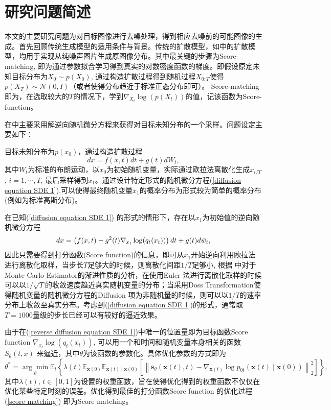 \chapter{研究问题简述}
本文的主要研究问题为对目标图像进行去噪处理，得到相应去噪前的可能图像的生成。首先回顾传统生成模型的适用条件与背景。传统的扩散模型，如\cite{song_2,DDPM,DDIM}中的扩散模型，均用于实现从纯噪声图片生成原图像分布。其中最关键的步骤为Score-matching, 即为通过参数拟合学习得到真实的对数密度函数的梯度。即假设原定未知目标分布为$X_0\sim p(X_0)$, 通过构造扩散过程得到随机过程$X_{0:T}$使得$p(X_{T})\sim \mathcal{N}(0,I)$（或者使得分布趋近于标准正态分布即可）。 Score-matching即为，在选取较大的$T$的情况下，学到$\nabla_{X_t}\log (p(X_t))$的值，记该函数为Score-function。     

在\cite{song_2}中主要采用解逆向随机微分方程来获得对目标未知分布的一个采样。问题设定主要如下：   

目标未知分布为$p(x_0)$，通过构造扩散过程
\begin{equation}
    dx = f(x,t)dt + g(t)dW_t,
    \label{diffusion equation SDE 1}
\end{equation}
其中$W_t$为标准的布朗运动，以$x_0$为初始随机变量，实际通过欧拉法离散化生成$x_{i/T}$, $i=1,\cdots, T$, 最后采样得到$x_1$。通过设计特定形式的随机微分方程(\ref{diffusion equation SDE 1}),可以使得最终随机变量$x_1$的概率分布为形式较为简单的概率分布 (例如为标准高斯分布)。   

在已知(\ref{diffusion equation SDE 1}) 的形式的情形下，存在以$x_1$为初始值的逆向随机微分方程
\begin{equation}
     dx = \left(f(x,t)-g^2(t)\nabla_{x_t}\log(q_t(x_t))\right)dt + g(t)d\Tilde{w}_t,
    \label{reverse diffusion equation SDE 1}
\end{equation}
因此只需要得到打分函数(Score function)的信息，即可从$x_1$开始逆向利用欧拉法进行离散化取样，当步长$T$足够大的时候，则离散化间距$1/T$足够小, 根据 
\cite{detemple}中对于Monte Carlo Estimator的渐进性质的分析，在使用Euler 法进行离散化取样的时候可以以$1/\sqrt{T}$的收敛速度趋近真实随机变量的分布；当采用Doss Transformation使得随机变量的随机微分方程的Diffusion 项为非随机量的时候，则可以以$1/T$的速率分布上收敛至真实分布。考虑到(\ref{diffusion equation SDE 1})的形式，通常取$T=1000$量级的步长已经可以有较好的逼近效果。      

由于在(\ref{reverse diffusion equation SDE 1})中唯一的位置量即为目标函数Score function $\nabla_{x_t}\log(q_t(x_t))$, 可以用一个和时间和随机变量本身相关的函数$S_{\theta}(t,x)$ 来逼近，其中$\theta$为该函数的参数化。具体优化参数的方式即为
\begin{equation}
{\theta}^*=\underset{{\theta}}{\arg \min } \mathbb{E}_t\left\{\lambda(t) \mathbb{E}_{\mathbf{x}(0)} \mathbb{E}_{\mathbf{x}(t) \mid \mathbf{x}(0)}\left[\left\|\mathbf{s}_{{\theta}}(\mathbf{x}(t), t)-\nabla_{\mathbf{x}(t)} \log p_{0 t}(\mathbf{x}(t) \mid \mathbf{x}(0))\right\|_2^2\right]\right\},
\label{score matching}
\end{equation}
其中$\lambda(t)$, $t\in [0,1]$为设置的权重函数，旨在使得优化得到的权重函数不仅仅在优化某些特定时刻的误差。优化得到最佳的打分函数Score function 的优化过程 (\ref{score matching}) 即为Score matching。    


